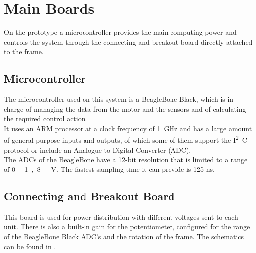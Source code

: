 \section{Main Boards}
On the prototype a microcontroller provides the main computing power and controls the system through the connecting and breakout board directly attached to the frame.

\subsection{Microcontroller}
The microcontroller used on this system is a BeagleBone Black, which is in charge of managing the data from the motor and the sensors and of calculating the required control action.\\
It uses an ARM processor at a clock frequency of \SI{1}{GHz} and has a large amount of general purpose inputs and outputs, of which some of them support the \si{I^2C} protocol or include an Analogue to Digital Converter (ADC).\\
The ADCs of the BeagleBone have a 12-bit resolution that is limited to a range of \si{0 - 1,8\ V}. The fastest sampling time it can provide is \si{125} \si{ns}\cite{Cameon}.

\subsection{Connecting and Breakout Board}
This board is used for power distribution with different voltages sent to each unit. There is also a built-in gain for the potentiometer, configured for the range of the BeagleBone Black ADC's and the rotation of the frame. The schematics can be found in .



